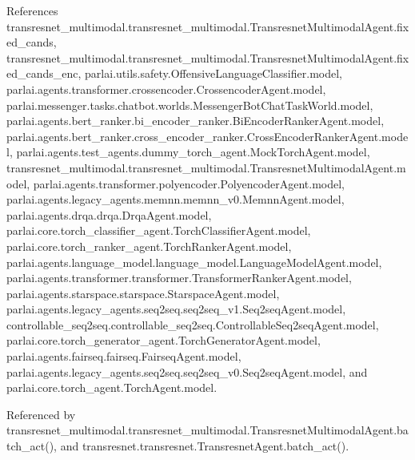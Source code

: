 References transresnet\+\_\+multimodal.\+transresnet\+\_\+multimodal.\+Transresnet\+Multimodal\+Agent.\+fixed\+\_\+cands, transresnet\+\_\+multimodal.\+transresnet\+\_\+multimodal.\+Transresnet\+Multimodal\+Agent.\+fixed\+\_\+cands\+\_\+enc, parlai.\+utils.\+safety.\+Offensive\+Language\+Classifier.\+model, parlai.\+agents.\+transformer.\+crossencoder.\+Crossencoder\+Agent.\+model, parlai.\+messenger.\+tasks.\+chatbot.\+worlds.\+Messenger\+Bot\+Chat\+Task\+World.\+model, parlai.\+agents.\+bert\+\_\+ranker.\+bi\+\_\+encoder\+\_\+ranker.\+Bi\+Encoder\+Ranker\+Agent.\+model, parlai.\+agents.\+bert\+\_\+ranker.\+cross\+\_\+encoder\+\_\+ranker.\+Cross\+Encoder\+Ranker\+Agent.\+model, parlai.\+agents.\+test\+\_\+agents.\+dummy\+\_\+torch\+\_\+agent.\+Mock\+Torch\+Agent.\+model, transresnet\+\_\+multimodal.\+transresnet\+\_\+multimodal.\+Transresnet\+Multimodal\+Agent.\+model, parlai.\+agents.\+transformer.\+polyencoder.\+Polyencoder\+Agent.\+model, parlai.\+agents.\+legacy\+\_\+agents.\+memnn.\+memnn\+\_\+v0.\+Memnn\+Agent.\+model, parlai.\+agents.\+drqa.\+drqa.\+Drqa\+Agent.\+model, parlai.\+core.\+torch\+\_\+classifier\+\_\+agent.\+Torch\+Classifier\+Agent.\+model, parlai.\+core.\+torch\+\_\+ranker\+\_\+agent.\+Torch\+Ranker\+Agent.\+model, parlai.\+agents.\+language\+\_\+model.\+language\+\_\+model.\+Language\+Model\+Agent.\+model, parlai.\+agents.\+transformer.\+transformer.\+Transformer\+Ranker\+Agent.\+model, parlai.\+agents.\+starspace.\+starspace.\+Starspace\+Agent.\+model, parlai.\+agents.\+legacy\+\_\+agents.\+seq2seq.\+seq2seq\+\_\+v1.\+Seq2seq\+Agent.\+model, controllable\+\_\+seq2seq.\+controllable\+\_\+seq2seq.\+Controllable\+Seq2seq\+Agent.\+model, parlai.\+core.\+torch\+\_\+generator\+\_\+agent.\+Torch\+Generator\+Agent.\+model, parlai.\+agents.\+fairseq.\+fairseq.\+Fairseq\+Agent.\+model, parlai.\+agents.\+legacy\+\_\+agents.\+seq2seq.\+seq2seq\+\_\+v0.\+Seq2seq\+Agent.\+model, and parlai.\+core.\+torch\+\_\+agent.\+Torch\+Agent.\+model.



Referenced by transresnet\+\_\+multimodal.\+transresnet\+\_\+multimodal.\+Transresnet\+Multimodal\+Agent.\+batch\+\_\+act(), and transresnet.\+transresnet.\+Transresnet\+Agent.\+batch\+\_\+act().

